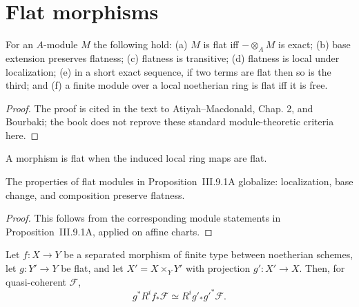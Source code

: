 \section{Flat morphisms}
\label{ha-ch3-sec9}
\begin{proposition}\label{ha-ch3-prop-flat-criteria}
For an $A$-module $M$ the following hold: (a) $M$ is flat iff
$-\otimes_A M$ is exact; (b) base extension preserves flatness; (c) flatness
is transitive; (d) flatness is local under localization; (e) in a short exact
sequence, if two terms are flat then so is the third; and (f) a finite module
over a local noetherian ring is flat iff it is free.

\end{proposition}
\begin{proof}

The proof is cited in the text to Atiyah--Macdonald, Chap. 2, and Bourbaki;
the book does not reprove these standard module-theoretic criteria here.

\end{proof}
\begin{definition}\label{ha-ch3-def-flat}
A morphism is flat when the induced local ring maps are flat.
\end{definition}
\begin{proposition}\label{ha-ch3-prop-flat-preservation}
The properties of flat modules in Proposition~III.9.1A globalize: localization,
base change, and composition preserve flatness.
\end{proposition}
\begin{proof}

This follows from the corresponding module statements in
Proposition~III.9.1A, applied on affine charts.

\end{proof}
\begin{proposition}\label{ha-ch3-prop-flat-base-change}
Let $f:X\to Y$ be a separated morphism of finite type between noetherian
schemes, let $g:Y'\to Y$ be flat, and let $X'=X\times_Y Y'$ with projection
$g':X'\to X$.  Then, for quasi-coherent $\mathcal F$,
\[
g^*R^if_*\mathcal F\simeq R^ig'_*g'^*\mathcal F.
\]

\end{proposition}
